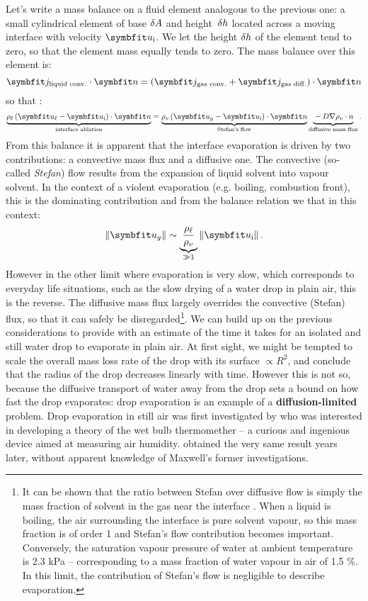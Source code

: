 Let's write a mass balance on a fluid element analogous to the previous one: a small cylindrical element of base $\delta A$ and height~$\delta h$ located across a moving interface with velocity $\bu_\text i$. We let the height $\delta h$ of the element tend to zero, so that the element mass equally tends to zero. The mass balance over this element is:
\begin{equation}
\bj_\text{liquid conv.} \cdot \bn = \lp\bj_\text{gas conv.} + \bj_\text{gas diff.}\rp \cdot \bn
\end{equation}
so that :
\begin{equation}
\underbrace{\vphantom{\bu_g}\rho_\ell \lp\bu_\ell - \bu_\text i\rp \cdot \bn}_\text{interface ablation} = \underbrace{\rho_v \lp\bu_g -\bu_\text i\rp\cdot \bn}_\text{Stefan's flow} \underbrace{\vphantom{\bu_g}- D \nabla \rho_v \cdot n}_\text{diffusive mass flux}.
\label{eq:evaporation_BC}
\end{equation}
From this balance it is apparent that the interface evaporation is driven by two contributions: a convective mass flux and a diffusive one. The convective (so-called \textit{Stefan}) flow results from the expansion of liquid solvent into vapour solvent. 
In the context of a violent evaporation (e.g. boiling, combustion front), this is the dominating contribution and from the balance relation we that in this context:
$$\left\|\bu_g\right\| \sim \underbrace{\frac{\rho_\ell}{\rho_v}}_{\gg 1} \left\|\bu_{\mathrm i}\right\|.$$
However in the other limit where evaporation is very slow, which corresponds to everyday life situations, such as the slow drying of a water drop in plain air, this is the reverse. The diffusive mass flux largely overrides the convective (Stefan) flux, so that it can safely be disregarded\footnote{It can be shown that the ratio between Stefan over diffusive flow is simply the mass fraction of solvent in the gas near the interface \citep{Magdelaine2019}. When a liquid is boiling, the air surrounding the interface is pure solvent vapour, so this mass fraction is of order 1 and Stefan's flow contribution becomes important. Conversely, the saturation vapour pressure of water at ambient temperature is 2.3 kPa -- corresponding to a mass fraction of water vapour in air of 1.5 \%. In this limit, the contribution of Stefan's flow is negligible to describe evaporation.}.
 We can build up on the previous considerations to provide with an estimate of the time it takes for an isolated and still water drop to evaporate in plain air. At first sight, we might be tempted to scale the overall mass loss rate of the drop with its surface $\propto R^2$, and conclude that the radius of the drop decreases linearly with time. However this is not so, because the diffusive transport of water away from the drop sets a bound on how fast the drop evaporates: drop evaporation is an example of a \textbf{diffusion-limited} problem. Drop evaporation in still air was first investigated by \citet{Maxwell1890} who was interested in developing a theory of the wet bulb thermomether -- a curious and ingenious device aimed at measuring air humidity. \citet{Langmuir1918} obtained the very same result years later, without apparent knowledge of Maxwell's former investigations.

